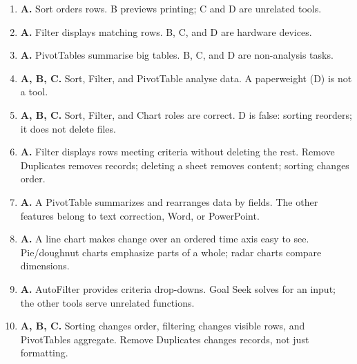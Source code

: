 \begin{enumerate}[label=\textbf{Q\arabic*.}, leftmargin=*]
\item \textbf{A.} Sort orders rows. B previews printing; C and D are unrelated tools.
\item \textbf{A.} Filter displays matching rows. B, C, and D are hardware devices.
\item \textbf{A.} PivotTables summarise big tables. B, C, and D are non-analysis tasks.
\item \textbf{A, B, C.} Sort, Filter, and PivotTable analyse data. A paperweight (D) is not a tool.
\item \textbf{A, B, C.} Sort, Filter, and Chart roles are correct. D is false: sorting reorders; it does not delete files.
\item \textbf{A.} Filter displays rows meeting criteria without deleting the rest. Remove Duplicates removes records; deleting a sheet removes content; sorting changes order.

\item \textbf{A.} A PivotTable summarizes and rearranges data by fields. The other features belong to text correction, Word, or PowerPoint.

\item \textbf{A.} A line chart makes change over an ordered time axis easy to see. Pie/doughnut charts emphasize parts of a whole; radar charts compare dimensions.

\item \textbf{A.} AutoFilter provides criteria drop-downs. Goal Seek solves for an input; the other tools serve unrelated functions.

\item \textbf{A, B, C.} Sorting changes order, filtering changes visible rows, and PivotTables aggregate. Remove Duplicates changes records, not just formatting.

\end{enumerate}
